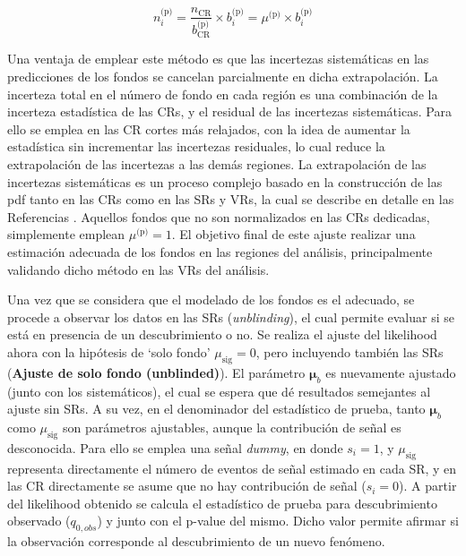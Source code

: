 

\begin{equation}
	n_i^{\text{(p)}} = \frac{n_{\text{CR}}}{b_{\text{CR}}^{\text{(p)}}} \times b_i^{\text{(p)}} = \mu^{\text{(p)}} \times b_i^{\text{(p)}}
\end{equation}

Una ventaja de emplear este método es que las incertezas sistemáticas en las predicciones de los fondos se cancelan parcialmente en dicha extrapolación. La incerteza total en el número de fondo en cada región es una combinación de la incerteza estadística de las CRs, y el residual de las incertezas sistemáticas. Para ello se emplea en las CR cortes más relajados, con la idea de aumentar la estadística sin incrementar las incertezas residuales, lo cual reduce la extrapolación de las incertezas a las demás regiones. La extrapolación de las incertezas sistemáticas es un proceso complejo basado en la construcción de las pdf tanto en las CRs como en las SRs y VRs, la cual se describe en detalle en las Referencias \cite{Baak:2014wma, Cranmer:1456844}. Aquellos fondos que no son normalizados en las CRs dedicadas, simplemente emplean $\mu^{\text{(p)}}=1$. El objetivo final de este ajuste realizar una estimación adecuada de los fondos en las regiones del análisis, principalmente validando dicho método en las VRs del análisis.

Una vez que se considera que el modelado de los fondos es el adecuado, se procede a observar los datos en las SRs (\textit{unblinding}), el cual permite evaluar si se está en presencia de un descubrimiento o no. Se realiza el ajuste del likelihood ahora con la hipótesis de `solo fondo' $\mu_\text{sig}=0$, pero incluyendo también las SRs (\textbf{Ajuste de solo fondo (unblinded)}). El parámetro $\bm{\mu}_b$ es nuevamente ajustado (junto con los sistemáticos), el cual se espera que dé resultados semejantes al ajuste sin SRs. A su vez, en el denominador del estadístico de prueba, tanto $\bm{\mu}_b$ como $\mu_\text{sig}$ son parámetros ajustables, aunque la contribución de señal es desconocida. Para ello se emplea una señal \textit{dummy}, en donde $s_i=1$, y $\mu_\text{sig}$ representa directamente el número de eventos de señal estimado en cada SR, y en las CR directamente se asume que no hay contribución de señal ($s_i=0$). 
A partir del likelihood obtenido se calcula el estadístico de prueba para descubrimiento observado ($q_{0, obs}$) y junto con el p-value del mismo. Dicho valor permite  afirmar si la observación corresponde al descubrimiento de un nuevo fenómeno.

